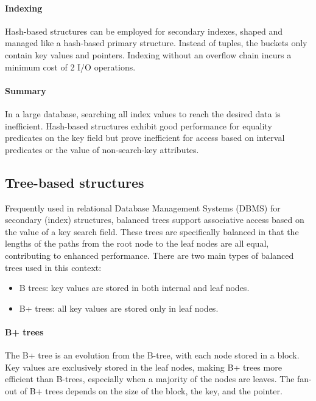 \paragraph*{Indexing}
Hash-based structures can be employed for secondary indexes, shaped and managed like a hash-based primary structure. 
Instead of tuples, the buckets only contain key values and pointers.
Indexing without an overflow chain incurs a minimum cost of 2 I/O operations.

\paragraph*{Summary}
In a large database, searching all index values to reach the desired data is inefficient. 
Hash-based structures exhibit good performance for equality predicates on the key field but prove inefficient for access based on interval predicates or the value of non-search-key attributes.

\subsection{Tree-based structures}
Frequently used in relational Database Management Systems (DBMS) for secondary (index) structures, balanced trees support associative access based on the value of a key search field.
These trees are specifically balanced in that the lengths of the paths from the root node to the leaf nodes are all equal, contributing to enhanced performance. 
There are two main types of balanced trees used in this context:
\begin{itemize}
    \item B trees: key values are stored in both internal and leaf nodes.
    \item B+ trees: all key values are stored only in leaf nodes.
\end{itemize}

\paragraph*{B+ trees}
The B+ tree is an evolution from the B-tree, with each node stored in a block. 
Key values are exclusively stored in the leaf nodes, making B+ trees more efficient than B-trees, especially when a majority of the nodes are leaves. 
The fan-out of B+ trees depends on the size of the block, the key, and the pointer.

